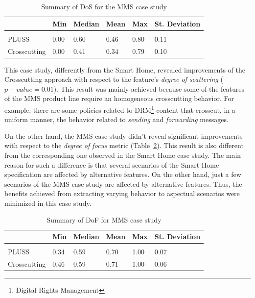 \documentclass{acm_proc_article-sp}
\begin{document}
\begin{table}[htb] \centering
\caption{Summary of DoS for the MMS case study}
\label{tab:mms-dos}
\begin{small}
\begin{tabular}{llllll} \hline
					& Min 	& Median 	& Mean 	& Max 	& St. Deviation \\ \hline \\
	PLUSS			& 0.00  & 0.60   	& 0.46  & 0.80 	& 0.11 			\\
	Crosscutting	& 0.00  & 0.41   	& 0.34 	& 0.79 	& 0.10			\\ \hline	
\end{tabular}
\end{small}
\end{table}

This case study, differently from the Smart Home, revealed improvements of the
Crosscutting approach with respect to the feature's \emph{degree of scattering}
($p-value=0.01$). This result was mainly achieved because some of the features of
the MMS product line require an homogeneous crosscutting behavior. For example,
there are some policies related to DRM\footnote{Digital Rights Management}
content that crosscut, in a uniform manner, the behavior related to
\emph{sending} and \emph{forwarding} messages.

On the other hand, the MMS case study didn't reveal significant improvements with
respect to the \emph{degree of focus} metric (Table~\ref{tab:mms-dof}). This
result is also different from the corresponding one observed in the Smart Home
case study. The main reason for such a difference is that several scenarios of
the Smart Home specification are affected by alternative features. On the other
hand, just a few scenarios of the MMS case study are affected by alternative
features. Thus, the benefits achieved from extracting varying behavior to
aspectual scenarios were minimized in this case study.

\begin{table}[htb] \centering
\caption{Summary of DoF for MMS case study}
\label{tab:mms-dof}
\begin{small}
\begin{tabular}{llllll} \hline
					& Min 	& Median 	& Mean 	& Max 	& St. Deviation \\ \hline \\
	PLUSS			& 0.34	& 0.59		& 0.70	& 1.00	& 0.07			\\
	Crosscutting	& 0.46  & 0.59   	& 0.71 	& 1.00 	& 0.06			\\ \hline	
\end{tabular}
\end{small}
\end{table}
\end{document}

